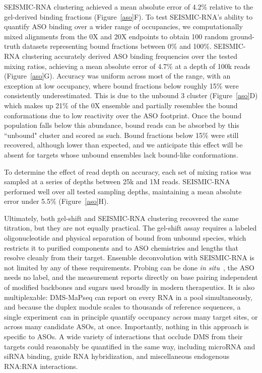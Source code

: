 \documentclass[unnumsec,webpdf,contemporary,large]{oup-authoring-template}%
\theoremstyle{thmstyleone}%
\theoremstyle{thmstyletwo}%
\theoremstyle{thmstylethree}%
\begin{document}
SEISMIC-RNA clustering achieved a mean absolute error of 4.2\% relative to the gel-derived binding fractions (Figure~\ref{aso}F). To test SEISMIC-RNA's ability to quantify ASO binding over a wider range of occupancies, we computationally mixed alignments from the 0X and 20X endpoints to obtain 100 random ground-truth datasets representing bound fractions between 0\% and 100\%. SEISMIC-RNA clustering accurately derived ASO binding frequencies over the tested mixing ratios, achieving a mean absolute error of 4.7\% at a depth of 100k reads (Figure~\ref{aso}G). Accuracy was uniform across most of the range, with an exception at low occupancy, where bound fractions below roughly 15\% were consistently underestimated. This is due to the unbound 3 cluster (Figure~\ref{aso}D) which makes up 21\% of the 0X ensemble and partially resembles the bound conformations due to low reactivity over the ASO footprint. Once the bound population falls below this abundance, bound reads can be absorbed by this ``unbound" cluster and scored as such. Bound fractions below 15\% were still recovered, although lower than expected, and we anticipate this effect will be absent for targets whose unbound ensembles lack bound-like conformations.

To determine the effect of read depth on accuracy, each set of mixing ratios was sampled at a series of depths between 25k and 1M reads. SEISMIC-RNA performed well over all tested sampling depths, maintaining a mean absolute error under 5.5\% (Figure~\ref{aso}H).

Ultimately, both gel-shift and SEISMIC-RNA clustering recovered the same titration, but they are not equally practical. The gel-shift assay requires a labeled oligonucleotide and physical separation of bound from unbound species, which restricts it to purified components and to ASO chemistries and lengths that resolve cleanly from their target. Ensemble deconvolution with SEISMIC-RNA is not limited by any of these requirements. Probing can be done \textit{in situ}~\cite{Rouskin2014,Zubradt2016}, the ASO needs no label, and the measurement reports directly on base pairing independent of modified backbones and sugars used broadly in modern therapeutics. It is also multiplexable: DMS-MaPseq can report on every RNA in a pool simultaneously, and because the duplex module scales to thousands of reference sequences, a single experiment can in principle quantify occupancy across many target sites, or across many candidate ASOs, at once. Importantly, nothing in this approach is specific to ASOs. A wide variety of interactions that occlude DMS from their targets could reasonably be quantified in the same way, including microRNA and siRNA binding, guide RNA hybridization, and miscellaneous endogenous RNA:RNA interactions.
\end{document}
